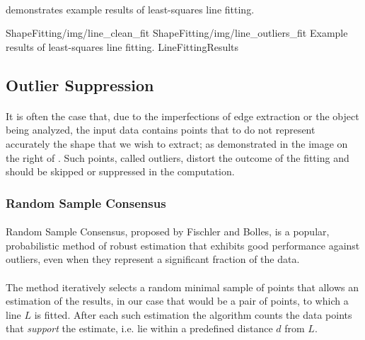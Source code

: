 \paragraph*{}
 demonstrates example results of least-squares line fitting.

\twoFigures
{ShapeFitting/img/line_clean_fit}
{ShapeFitting/img/line_outliers_fit}
{Example results of least-squares line fitting.}
{LineFittingResults}
{\basicWidth}

\subsection{Outlier Suppression}

\paragraph*{}
It is often the case that, due to the imperfections of edge extraction or the object being analyzed, the input data contains points that to do not represent accurately the shape that we wish to extract; as demonstrated in the image on the right of . Such points, called outliers, distort the outcome of the fitting and should be skipped or suppressed in the computation.

\subsubsection{Random Sample Consensus}

\paragraph*{}
Random Sample Consensus, proposed\cite{FischlerBolles81} by Fischler and Bolles, is a popular, probabilistic method of robust estimation that exhibits good performance against outliers, even when they represent a significant fraction of the data.

\paragraph*{}
The method iteratively selects a random minimal sample of points that allows an estimation of the results, in our case that would be a pair of points, to which a line $L$ is fitted. After each such estimation the algorithm counts the data points that \textit{support} the estimate, i.e. lie within a predefined distance $d$ from $L$. 

